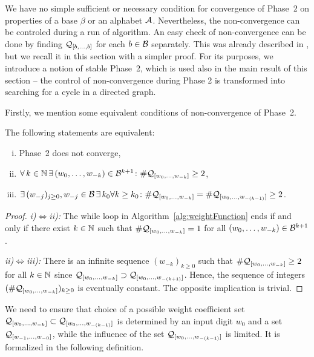 \label{sec:convergencePhase2}

We have no simple sufficient or necessary condition for convergence of Phase~2 on properties of a base $\beta$ or an alphabet $\mathcal{A}$. Nevertheless, the non-convergence can be controled during a run of algorithm. An easy check of non-convergence can be done by finding $\mathcal{Q}_{[b, \dots, b]}$ for each $b\in\mathcal{B}$ separately. This was already described in \cite{vu}, but we recall it in this section with a simpler proof. For its purposes, we introduce a notion of stable Phase~2, which is used also in the main result of this section -- the control of non-convergence during Phase 2 is transformed into searching for a cycle in a directed graph.

Firstly, we mention some equivalent conditions of non-convergence of Phase~2. 
\begin{lem}
\label{lem:equivalentStatementsForNonConvergenePhaseTwo}
The following statements are equivalent:
\begin{enumerate}[i)]
	\item Phase~2 does not converge,
	\item $\forall \,k\in \mathbb{N} \,\exists\, (w_{0}, \dots, w_{-k})\in\mathcal{B}^{k+1} \colon \#\mathcal{Q}_{[w_{0}, \dots, w_{-k}]}\geq 2$,
	\item $\exists \,(w_{-j})_{j\geq 0}, w_{-j}\in\mathcal{B} \,\exists\, k_0\forall k\geq k_0 \colon \#\mathcal{Q}_{[w_{0}, \dots, w_{-k}]}=\#\mathcal{Q}_{[w_{0}, \dots, w_{-(k-1)}]}\geq 2$.
\end{enumerate}
\end{lem}
\begin{proof}
\textit{i)}$\iff$\textit{ii):} The while loop in Algorithm~\ref{alg:weightFunction} ends if and only if there exist $k\in\mathbb{N}$ such that $\#\mathcal{Q}_{[w_{0}, \dots, w_{-k}]}=1$ for all $(w_{0}, \dots, w_{-k})\in\mathcal{B}^{k+1}$.

\textit{ii)}$\iff$\textit{iii):} There is an infinite sequence $(w_{-k})_{k\geq 0}$ such that $\#\mathcal{Q}_{[w_{0}, \dots, w_{-k}]}\geq 2$ for all $k\in\mathbb{N}$ since $\mathcal{Q}_{[w_{0}, \dots, w_{-k}]}\supset\mathcal{Q}_{[w_{0}, \dots, w_{-(k+1)}]}$. Hence, the sequence of integers $(\#\mathcal{Q}_{[w_{0}, \dots, w_{-k}]})_{k\geq 0}$ is eventually constant. The opposite implication is trivial.
\end{proof}

We need to ensure that choice of a possible weight coefficient set $\mathcal{Q}_{[w_{0}, \dots, w_{-k}]}\subset \mathcal{Q}_{[w_{0}, \dots, w_{-(k-1)}]}$ is determined by an input digit $w_0$ and a set $\mathcal{Q}_{[w_{-1}, \dots, w_{-0}]}$, while the influence of the set $\mathcal{Q}_{[w_{0}, \dots, w_{-(k-1)}]}$ is limited. It is formalized in the following definition.

